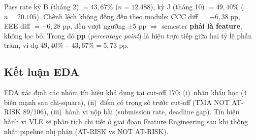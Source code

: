 Pass rate kỳ B (tháng 2) $= 43{,}67\%$ ($n=12.488$), kỳ J (tháng 10)
$= 49{,}40\%$ ($n=20.105$). Chênh lệch không đồng đều theo module: CCC
diff $= -6{,}38$ pp, EEE diff $= -6{,}28$ pp, đều vượt ngưỡng $\pm 5$ pp
$\Rightarrow$ semester \textbf{phải là feature}, không lọc bỏ. Trong đó
\textbf{pp} (\textit{percentage point})
là hiệu trực tiếp giữa hai tỷ lệ phần trăm, ví dụ
$49{,}40\% - 43{,}67\% = 5{,}73$ pp.

\subsection{Kết luận EDA}

EDA xác định các nhóm tín hiệu khả dụng tại cut-off 170: (i)~nhân
khẩu học (4 biến mạnh sau chi-square), (ii)~điểm có trọng số trước
cut-off (TMA NOT AT-RISK 89/106), (iii)~hành vi nộp bài (submission rate,
deadline gap). Tín hiệu hành vi VLE sẽ phân tích chi tiết ở giai
đoạn Feature Engineering sau khi thống nhất pipeline nhị phân
(AT-RISK vs NOT AT-RISK).

\newpage
